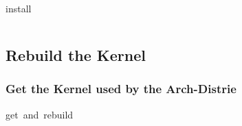 \documentclass[11pt, a4paper,ngerman]{article}
\begin{document}
\begin{mintedbox}[breakable=true,
 bottomrule=0.5mm,
 width=\paperwidth-3cm,
 boxsep=1mm, 
 enhanced=true,
 colframe = monoblack,
 drop fuzzy shadow,
 colback = black
 ]{install}%
 

     \inputminted[firstline=122,lastline=123, 
     linenos=true, framesep=2mm, mathescape, numbersep=5pt,tabsize=4,%
]{bash}{includes/archlinux.sh}%

\end{mintedbox}%
\vspace{-0.4cm}

\subsection{Rebuild the Kernel}
\subsubsection{Get the Kernel used by the Arch-Distrie}

\begin{mintedbox}[breakable=true,
 bottomrule=0.5mm,
 width=\paperwidth-3cm,
 boxsep=1mm, 
 enhanced=true,
 colframe = monoblack,
 drop fuzzy shadow,
 colback = black
 ]{get\ and\ rebuild}%
 

     \inputminted[firstline=128,lastline=139, 
     linenos=true, framesep=2mm, mathescape, numbersep=5pt,tabsize=4,%
]{bash}{includes/archlinux.sh}%

\end{mintedbox}%
\vspace{-0.4cm}









\newpage
\end{document}
